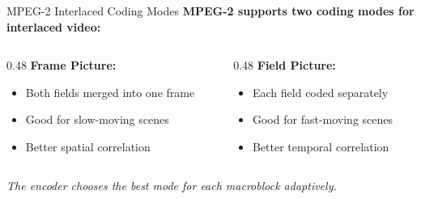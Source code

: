\documentclass[aspectratio=169,12pt]{beamer}
\begin{document}
\begin{frame}{MPEG-2 Interlaced Coding Modes}
    \textbf{MPEG-2 supports two coding modes for interlaced video:}
    
    \vspace{0.3cm}
    \begin{columns}
        \begin{column}{0.48\textwidth}
            \textbf{Frame Picture:}
            \begin{itemize}
                \item Both fields merged into one frame
                \item Good for slow-moving scenes
                \item Better spatial correlation
            \end{itemize}
            
            \begin{center}
            \end{center}
        \end{column}
        \begin{column}{0.48\textwidth}
            \textbf{Field Picture:}
            \begin{itemize}
                \item Each field coded separately
                \item Good for fast-moving scenes
                \item Better temporal correlation
            \end{itemize}
            
            \begin{center}
            \end{center}
        \end{column}
    \end{columns}
    
    \vspace{0.3cm}
    \textit{The encoder chooses the best mode for each macroblock adaptively.}
\end{frame}
\end{document}

